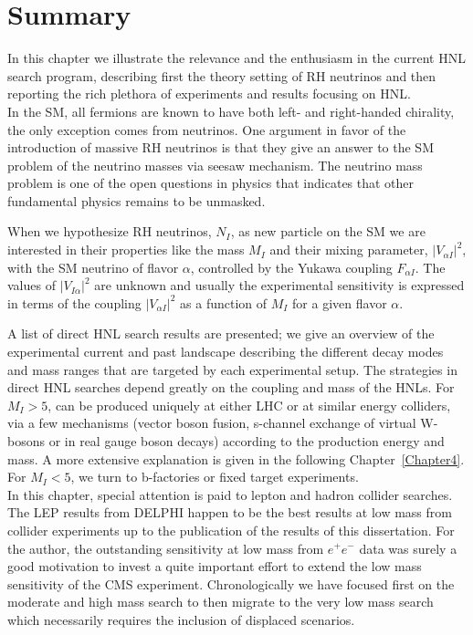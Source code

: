 \section{Summary}
In this chapter we illustrate the relevance and the enthusiasm in the
current HNL search program, describing first the theory setting of RH
neutrinos and then reporting the rich plethora of experiments and results
focusing on HNL.\\
In the SM, all fermions are known to have both
left- and right-handed chirality, the only exception comes from 
neutrinos. One argument in favor of the introduction of massive RH
neutrinos is that they give an answer to the SM problem of the
neutrino masses via seesaw mechanism. The neutrino mass
problem is one of the open questions in physics that indicates that
other fundamental physics remains to be unmasked.

When we hypothesize RH neutrinos, $N_{I}$, as new particle on the SM we
are interested in their properties like the mass $M_I$ and
their mixing parameter, $|V_{\alpha I}|^2$,  with the SM neutrino of flavor $\alpha$,
controlled by the Yukawa coupling $F_{\alpha I}$. The values of $|V_{I
  \alpha}|^2$ are unknown and usually the experimental
sensitivity is expressed in terms of the coupling $|V_{\alpha I}|^2$
as a function of $M_I$ for a given flavor
$\alpha$.

A list of direct HNL search results are presented; we give an overview
of the experimental current and past landscape describing the different decay modes and
mass ranges that are targeted by each experimental setup.
The strategies in direct HNL searches depend greatly on the coupling
and mass of the HNLs. For $M_{I} > 5$\GeV, \hnl can be
produced uniquely at either LHC or at similar energy colliders, via a few
mechanisms (vector boson fusion, s-channel exchange of virtual
W-bosons or in real gauge boson decays) according to the production
energy and \hnl mass. A more extensive explanation is given in the following
Chapter~\ref{Chapter4}. For $M_{I} < 5$\GeV, we turn to b-factories
or fixed target experiments. \\
In this chapter, special attention is paid to lepton and hadron collider
searches. The LEP results from DELPHI happen to be the best results at
low mass from collider experiments up to the publication of the results
of this dissertation. For the author, the outstanding sensitivity at low mass from
$e^{+}e^{-}$ data was surely a good motivation to invest a quite
important effort to extend the low mass sensitivity of
the CMS experiment. Chronologically we have focused first on the
moderate and high mass search to then migrate to the very low mass search which
necessarily requires the inclusion of displaced scenarios.

